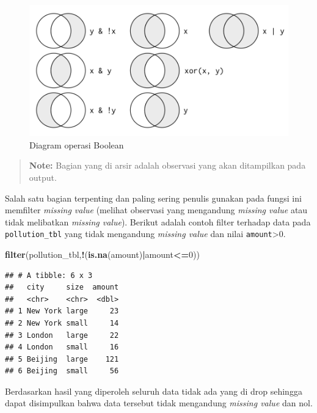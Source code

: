 \documentclass[]{book}
\newenvironment{Shaded}{\begin{snugshade}}{\end{snugshade}}
\newcommand{\KeywordTok}[1]{\textcolor[rgb]{0.13,0.29,0.53}{\textbf{#1}}}
\newcommand{\DecValTok}[1]{\textcolor[rgb]{0.00,0.00,0.81}{#1}}
\newcommand{\OperatorTok}[1]{\textcolor[rgb]{0.81,0.36,0.00}{\textbf{#1}}}
\newcommand{\NormalTok}[1]{#1}
\begin{document}
\begin{figure}

{\centering \includegraphics[width=6.57in]{filter} 

}

\caption{Diagram operasi Boolean}\label{fig:filter}
\end{figure}

\begin{quote}
\textbf{Note: } Bagian yang di arsir adalah observasi yang akan
ditampilkan pada output.
\end{quote}

Salah satu bagian terpenting dan paling sering penulis gunakan pada
fungsi ini memfilter \emph{missing value} (melihat observasi yang
mengandung \emph{missing value} atau tidak melibatkan \emph{missing
value}). Berikut adalah contoh filter terhadap data pada
\texttt{pollution\_tbl} yang tidak mengandung \emph{missing value} dan
nilai \texttt{amount}\textgreater{}0.

\begin{Shaded}
\begin{Highlighting}[]
\KeywordTok{filter}\NormalTok{(pollution_tbl,}\OperatorTok{!}\NormalTok{(}\KeywordTok{is.na}\NormalTok{(amount)}\OperatorTok{|}\NormalTok{amount}\OperatorTok{<=}\DecValTok{0}\NormalTok{))}
\end{Highlighting}
\end{Shaded}

\begin{verbatim}
## # A tibble: 6 x 3
##   city     size  amount
##   <chr>    <chr>  <dbl>
## 1 New York large     23
## 2 New York small     14
## 3 London   large     22
## 4 London   small     16
## 5 Beijing  large    121
## 6 Beijing  small     56
\end{verbatim}

Berdasarkan hasil yang diperoleh seluruh data tidak ada yang di drop
sehingga dapat disimpulkan bahwa data tersebut tidak mengandung
\emph{missing value} dan nol.
\end{document}
